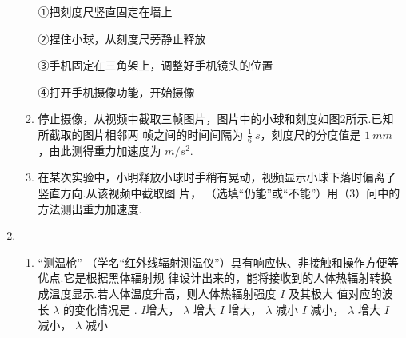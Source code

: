 \begin{enumerate}
\begin{enumerate}
①把刻度尺竖直固定在墙上

②捏住小球，从刻度尺旁静止释放

③手机固定在三角架上，调整好手机镜头的位置

④打开手机摄像功能，开始摄像

\item 
停止摄像，从视频中截取三帧图片，图片中的小球和刻度如图$ 2 $所示.已知所截取的图片相邻两
帧之间的时间间隔为 $ \frac{ 1 }{ 6 } \ s $，刻度尺的分度值是 $ 1 \ mm $，由此测得重力加速度为 \underlinegap $ m/s^{2} $.

\item 
在某次实验中，小明释放小球时手稍有晃动，视频显示小球下落时偏离了竖直方向.从该视频中截取图
片， \underlinegap （选填“仍能”或“不能”）用（$ 3 $）问中的方法测出重力加速度.

\end{enumerate}













\item 
\begin{enumerate}
\item
“测温枪”
（学名“红外线辐射测温仪”）具有响应快、非接触和操作方便等优点.它是根据黑体辐射规
律设计出来的，能将接收到的人体热辐射转换成温度显示.若人体温度升高，则人体热辐射强度 $ I $ 及其极大
值对应的波长 $ \lambda $ 的变化情况是 \underlinegap .
\fourchoices
{$ I $增大， $ \lambda $ 增大}
{$ I $ 增大， $ \lambda $ 减小}
{$ I $ 减小， $ \lambda $ 增大}
{$ I $ 减小， $ \lambda $ 减小}


\end{enumerate}
\end{enumerate}
